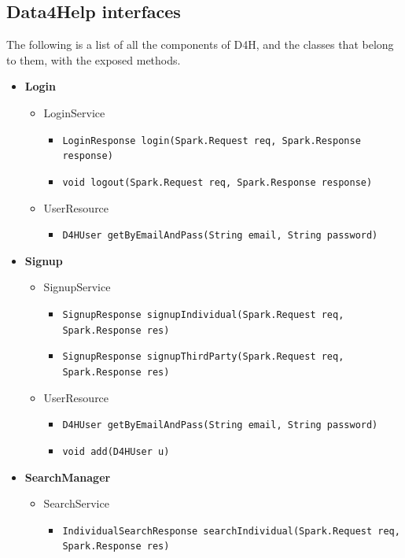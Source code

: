 \documentclass[a4paper, hidelinks, 12pt]{report}
\begin{document}
	\subsection{Data4Help interfaces}
	The following is a list of all the components of D4H, and the classes that belong to them, with the exposed methods.
	\begin{itemize}
		\item{\textbf{Login}}
			\begin{itemize}
				\item{LoginService}
					\begin{itemize}
						\item{\verb|LoginResponse login(Spark.Request req, Spark.Response response)|}
						\item{\verb|void logout(Spark.Request req, Spark.Response response)|}
					\end{itemize}
				\item{UserResource}
					\begin{itemize}
						\item{\verb|D4HUser getByEmailAndPass(String email, String password)|}
					\end{itemize}
			\end{itemize}
			\item{\textbf{Signup}}
			\begin{itemize}
				\item{SignupService}
					\begin{itemize}
						\item{\verb|SignupResponse signupIndividual(Spark.Request req, Spark.Response res)|}
						\item{\verb|SignupResponse signupThirdParty(Spark.Request req, Spark.Response res)|}
					\end{itemize}
				\item{UserResource}
					\begin{itemize}
						\item{\verb|D4HUser getByEmailAndPass(String email, String password)|}
						\item{\verb|void add(D4HUser u)|}
					\end{itemize}
			\end{itemize}
			\item{\textbf{SearchManager}}
			\begin{itemize}
				\item{SearchService}
					\begin{itemize}
						\item{\verb|IndividualSearchResponse searchIndividual(Spark.Request req,|\\ \verb|Spark.Response res)|}

\end{itemize}
\end{itemize}
\end{itemize}
\end{document}
